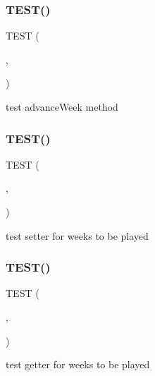 \subsubsection{\texorpdfstring{T\+E\+S\+T()}{TEST()}\hspace{0.1cm}{\footnotesize\ttfamily [19/54]}}
{\footnotesize\ttfamily T\+E\+ST (\begin{DoxyParamCaption}\item[{game\+Test}]{,  }\item[{advance\+Week\+Test}]{ }\end{DoxyParamCaption})}

test advance\+Week method \mbox{\label{group__group2_ga6ecc7702d6197ffc0ef49cf05e2525ff}} 
\subsubsection{\texorpdfstring{T\+E\+S\+T()}{TEST()}\hspace{0.1cm}{\footnotesize\ttfamily [20/54]}}
{\footnotesize\ttfamily T\+E\+ST (\begin{DoxyParamCaption}\item[{game\+Test}]{,  }\item[{set\+Weeks\+To\+Be\+Played\+Test}]{ }\end{DoxyParamCaption})}

test setter for weeks to be played \mbox{\label{group__group2_ga2485f23f45d9ff967bbc5628f5e3cb3f}} 
\subsubsection{\texorpdfstring{T\+E\+S\+T()}{TEST()}\hspace{0.1cm}{\footnotesize\ttfamily [21/54]}}
{\footnotesize\ttfamily T\+E\+ST (\begin{DoxyParamCaption}\item[{game\+Test}]{,  }\item[{get\+Weeks\+To\+Be\+Played\+Test}]{ }\end{DoxyParamCaption})}

test getter for weeks to be played \mbox{\label{group__group2_ga197666470ad18d903e30ea79e74c13aa}} 
